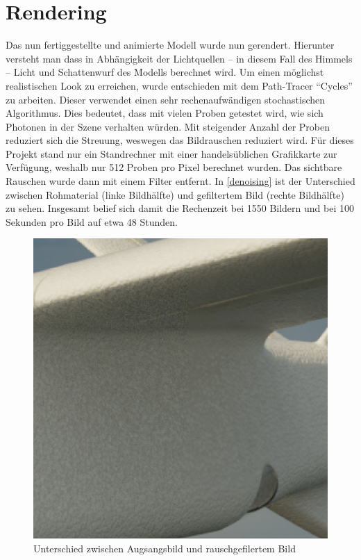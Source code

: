 \section{Rendering}

Das nun fertiggestellte und animierte Modell wurde nun gerendert. Hierunter versteht man dass in Abhängigkeit der Lichtquellen -- in diesem Fall des Himmels -- Licht und Schattenwurf des Modells berechnet wird. Um einen möglichst realistischen Look zu erreichen, wurde entschieden mit dem Path-Tracer ``Cycles'' zu arbeiten. Dieser verwendet einen sehr rechenaufwändigen stochastischen Algorithmus. Dies bedeutet, dass mit vielen Proben getestet wird, wie sich Photonen in der Szene verhalten würden. Mit steigender Anzahl der Proben reduziert sich die Streuung, weswegen das Bildrauschen reduziert wird. Für dieses Projekt stand nur ein Standrechner mit einer handelsüblichen Grafikkarte zur Verfügung, weshalb nur 512 Proben pro Pixel berechnet wurden. Das sichtbare Rauschen wurde dann mit einem Filter entfernt. In \autoref{denoising} ist der Unterschied zwischen Rohmaterial (linke Bildhälfte) und gefiltertem Bild (rechte Bildhälfte) zu sehen. Insgesamt belief sich damit die Rechenzeit bei 1550 Bildern und bei 100 Sekunden pro Bild auf etwa 48 Stunden.

\begin{figure}[H]
\begin{center}
\includegraphics[width=\textwidth]{gfx/post/denoising.jpg}
\caption{Unterschied zwischen Augsangsbild und rauschgefilertem Bild}
\label{denoising}
\end{center}
\end{figure}

